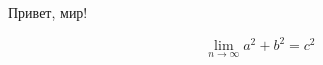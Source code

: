 \documentclass[12pt,a4paper]{article}
\begin{document}
Привет, мир!

\[
\lim_{n\to\infty} a^2+b^2 = c^2
\]
\end{document}
